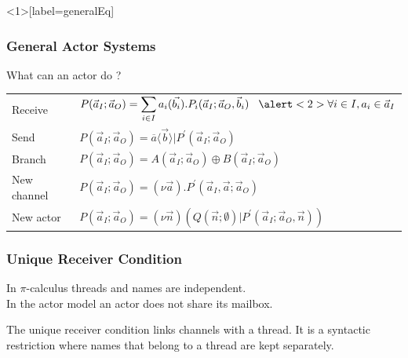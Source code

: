 \documentclass{beamer}
\theoremstyle{remark}
\theoremstyle{definition}
\begin{document}
\begin{frame}<1>[label=generalEq]
\frametitle{General Actor Systems}

What can an actor do ?

\vspace{5mm}

\begin{tabular}{ll}
Receive & $\displaystyle P(\vec a_I; \vec a_O) = \sum_{i \in I} a_i (\vec{b_i}).P_i(\vec a_I ;\vec a_O, \vec b_i) \hspace{3mm} \alert<2>{\forall i \in I, a_i \in \vec a_I}$ \\
Send & $P(\vec a_I; \vec a_O) = \overline{a}\langle \vec{b} \rangle | P^\prime(\vec a_I ;\vec a_O)$ \\
Branch & $P(\vec a_I; \vec a_O) = A(\vec a_I; \vec a_O) \oplus B(\vec a_I; \vec a_O)$ \\
New channel & $P(\vec a_I; \vec a_O) = (\nu \vec a).P^\prime(\vec a_I, \vec a; \vec a_O)$ \\
New actor & $P(\vec a_I; \vec a_O) = (\nu \vec n)(Q(\vec n;\emptyset) | P^\prime(\vec a_I ; \vec a_O , \vec n))$
\end{tabular}
\end{frame}

\begin{frame}
\frametitle{Unique Receiver Condition \cite{DBLP:journals/tcs/Amadio00}}
In $\pi$-calculus threads and names are independent.\\
In the actor model \alert{an actor does not share its mailbox}.

\vspace{20pt}

The unique receiver condition \alert{links channels with a thread}.
It is a syntactic restriction where names that belong to a thread are kept separately.

\end{frame}

\end{document}

